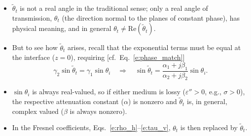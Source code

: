 \documentclass[11pt, oneside]{article}
\begin{document}
\begin{itemize}
	\item[$\bigstar$] $\tilde{\theta}_t$ is not a real angle in the traditional sense; only a real angle of transmission, $\theta_t$ (the direction normal to the planes of constant phase), has physical meaning, and in general $\theta_t \ne \mathrm{Re}(\tilde{\theta}_t)$.
	\item But to see how $\tilde{\theta}_t$ arises, recall that the exponential terms must be equal at the interface ($z = 0$), requiring [cf.\ Eq.~\eqref{e:phase_match}]
	\begin{equation}
		\label{e:snell_lossy}
		\gamma_2\sin\tilde{\theta}_t = \gamma_1\sin\theta_i
		\quad\Rightarrow\quad
		\sin\tilde{\theta}_t = \frac{\alpha_1 + j\beta_1}{\alpha_2 + j\beta_2}\sin\theta_i.
	\end{equation}
	\item $\sin\theta_i$ is always real-valued, so if either medium is lossy ($\varepsilon'' > 0$, e.g., $\sigma > 0$), the respective attenuation constant ($\alpha$) is nonzero and $\tilde{\theta}_t$ is, in general, complex valued ($\beta$ is always nonzero).
	\item In the Fresnel coefficients, Eqs.~\eqref{e:rho_h}--\eqref{e:tau_v}, $\theta_t$ is then replaced by $\tilde{\theta}_t$.
\end{itemize}
\end{document}

